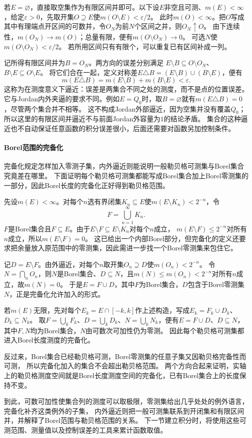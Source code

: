 若$E=\varnothing$，直接取空集作为有限区间并即可。以下设$E$非空且可测、$m(E)<\infty$，给定$\varepsilon>0$，先取开集$O\supseteq E$使$m(O\setminus E)<\varepsilon/2$。
此时$m(O)<\infty$。把$O$写成其中有理端点开区间的可数并，令$O_N$为前$N$个区间之并，则$O_N\uparrow O$。
由下连续性，$m(O_N)\to m(O)$；总量有限，便有$m(O\setminus O_N)\to0$。
可选$N$使$m(O\setminus O_N)<\varepsilon/2$。
若所用区间只有有限个，可以重复已有区间补成一列。

记所得有限区间并为$B=O_N$。两方向的误差分别满足
$E\setminus B\subseteq O\setminus O_N$、$B\setminus E\subseteq O\setminus E$。
将它们合在一起，定义对称差$E\triangle B=(E\setminus B)\cup(B\setminus E)$，便有
\[
 m(E\triangle B)=m(E\setminus B)+m(B\setminus E)<\varepsilon.
\]
这称为在测度意义下逼近：误差是两集合不同之处的测度，而不是点的位置误差。
它与Jordan内外夹逼的要求不同。例如$E=Q_0$时，取$B=\varnothing$就有$m(E\triangle B)=0$，尽管两个集合并不相等。
这不构成Jordan外部逼近，因为空集并没有覆盖$Q_0$；所以这里的有限区间并逼近不与前面Jordan外容量为$1$的结论矛盾。
集合的这种逼近也不自动保证任意函数的积分误差很小，后面还需要对函数另加控制条件。

\paragraph{Borel范围的完备化}

完备化规定怎样加入零测子集，内外逼近则能说明一般勒贝格可测集与Borel集合究竟差在哪里。
下面证明每个勒贝格可测集都能写成Borel集合加上Borel零测集的一部分，因此Borel长度的完备化正好得到勒贝格范围。

先设$m(E)<\infty$。对每个$n$选有界闭集$K_n\subseteq E$使$m(E\setminus K_n)<2^{-n}$，令
\[
 F=\bigcup_{n=1}^{\infty}K_n.
\]
$F$是Borel集合且$F\subseteq E$。由于$E\setminus F\subseteq E\setminus K_n$对每个$n$成立，
$m(E\setminus F)\leq2^{-n}$对所有$n$成立，所以$m(E\setminus F)=0$。
这已给出一个内部Borel部分，但完备化的定义还要求把余量放入原范围中的零测集，因此需进一步找一个Borel零测集来包住它。

记$D=E\setminus F$。由外逼近，对每个$n$取开集$O_n\supseteq D$使$m(O_n)<2^{-n}$。
令$N=\bigcap_nO_n$，则$N$是Borel集合、$D\subseteq N$，且$m(N)\leq m(O_n)<2^{-n}$对所有$n$成立，故$m(N)=0$。
于是$E=F\cup D$，其中$F$为Borel集合，$D$包含于Borel零测集$N$，正是完备化允许加入的形式。

若$m(E)$无限，先对每个$E_k=E\cap[-k,k]$作上述构造，写成$E_k=F_k\cup D_k$、$D_k\subseteq N_k$。
取$F=\bigcup_kF_k$、$D=\bigcup_kD_k$、$N=\bigcup_kN_k$，便有$E=F\cup D$、$D\subseteq N$，
其中$F,N$均为Borel集合，$N$由可数次可加性仍为零测。
因此每个勒贝格可测集都进入Borel长度测度的完备化。

反过来，Borel集合已经勒贝格可测，Borel零测集的任意子集又因勒贝格完备性而可测，
所以完备化加入的集合不会超出勒贝格范围。
两个方向合起来证明，实轴上的勒贝格测度空间就是Borel长度测度空间的完备化，已有Borel集合上的长度保持不变。

到此，可数可加性使集合列的测度可以取极限，零测集给出几乎处处的例外语言，完备化补齐这类例外的子集，
内外逼近则把一般可测集联系到开闭集和有限区间并，并解释了Borel范围与勒贝格范围的关系。
下一节建立积分时，将使用这些可测范围、测量值以及控制误差的工具来累计函数取值。

\FloatBarrier
